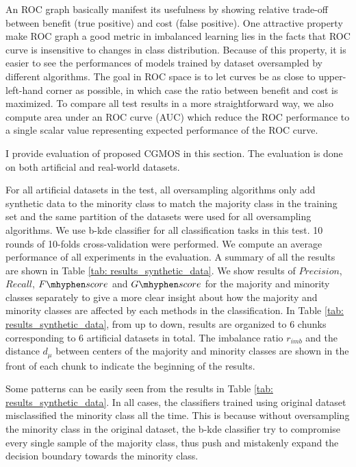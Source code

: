 \documentclass{iitthesis}
\newcommand\fscore{\mathop{F\mhyphen score}}
\newcommand\gscore{\mathop{G\mhyphen score}}
\begin{document}
An ROC graph basically manifest its usefulness by showing relative trade-off between benefit (true positive) and cost (false positive). One attractive property make ROC graph a good metric in imbalanced learning lies in the facts that ROC curve is insensitive to changes in class distribution. Because of this property, it is easier to see the performances of models trained by dataset oversampled by different algorithms. The goal in ROC space is to let curves be as close to upper-left-hand corner as possible, in which case the ratio between benefit and cost is maximized. To compare all test results in a more straightforward way, we also compute area under an ROC curve (AUC) which reduce the ROC performance to a single scalar value representing expected performance of the ROC curve.
 
I provide evaluation of proposed CGMOS in this section. The evaluation is done on both artificial and real-world datasets.

For all artificial datasets in the test, all oversampling algorithms only add synthetic data to the minority class to match the majority class in the training set and the same partition of the datasets were used for all oversampling algorithms. We use b-kde classifier for all classification tasks in this test. 10 rounds of 10-folds cross-validation were performed. We compute an average performance of all experiments in the evaluation. A summary of all the results are shown in Table \ref{tab: results_synthetic_data}. We show results of $Precision$, $Recall$, $\fscore$ and $\gscore$ for the majority and minority classes separately to give a more clear insight about how the majority and minority classes are affected by each methods in the classification. In Table \ref{tab: results_synthetic_data}, from up to down, results are organized to 6 chunks corresponding to 6 artificial datasets in total. The imbalance ratio $r_{imb}$ and the distance $d_{\mu}$ between centers of the majority and minority classes are shown in the front of each chunk to indicate the beginning of the results.

Some patterns can be easily seen from the results in Table \ref{tab: results_synthetic_data}. In all cases, the classifiers trained using original dataset misclassified the minority class all the time. This is because without oversampling the minority class in the original dataset, the b-kde classifier try to compromise every single sample of the majority class, thus push and mistakenly expand the decision boundary towards the minority class.
\end{document}
